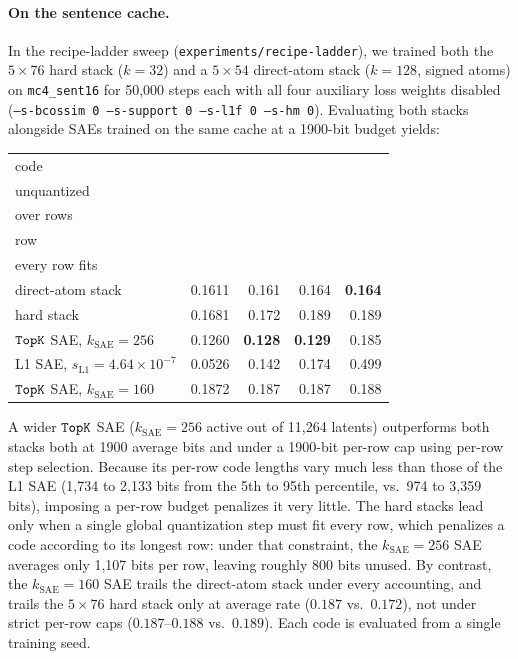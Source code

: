 \paragraph{On the sentence cache.}
In the recipe-ladder sweep (\texttt{experiments/\allowbreak recipe-ladder}), we
trained both the $5\times76$ hard stack ($k{=}32$) and a $5\times54$
direct-atom stack ($k{=}128$, signed atoms) on \texttt{mc4\_sent16} for
50{,}000 steps each with all four auxiliary loss weights disabled
(\texttt{--s-bcossim 0 --s-support 0 --s-l1f 0 --s-hm 0}). Evaluating both
stacks alongside SAEs trained on the same cache at a 1900-bit budget
yields:

\begin{center}\small\setlength{\tabcolsep}{4pt}
\begin{tabular}{@{}lrrrr@{}}
\toprule
code & \stackhead[r]{$\fvu$\\unquantized} & \stackhead[r]{averaged\\over rows} & \stackhead[r]{on every\\row} & \stackhead[r]{one step\\every row fits} \\
\midrule
direct-atom stack & 0.1611 & 0.161 & 0.164 & \textbf{0.164} \\
hard stack & 0.1681 & 0.172 & 0.189 & 0.189 \\
$\mathop{\mathtt{TopK}}\limits$ SAE, $k_{\mathrm{SAE}}{=}256$ & 0.1260 & \textbf{0.128} & \textbf{0.129} & 0.185 \\
L1 SAE, $s_{\mathrm{L1}}{=}4.64\times10^{-7}$ & 0.0526 & 0.142 & 0.174 & 0.499 \\
$\mathop{\mathtt{TopK}}\limits$ SAE, $k_{\mathrm{SAE}}{=}160$ & 0.1872 & 0.187 & 0.187 & 0.188 \\
\bottomrule
\end{tabular}
\end{center}

\noindent A wider $\mathop{\mathtt{TopK}}\limits$ SAE ($k_{\mathrm{SAE}}{=}256$ active out of
11{,}264 latents) outperforms both stacks both at 1900 average bits and
under a 1900-bit per-row cap using per-row step selection. Because its
per-row code lengths vary much less than those of the L1 SAE (1{,}734 to
2{,}133 bits from the 5th to 95th percentile, vs.\ 974 to 3{,}359 bits),
imposing a per-row budget penalizes it very little. The hard stacks lead
only when a single global quantization step must fit every row, which
penalizes a code according to its longest row: under that constraint, the
$k_{\mathrm{SAE}}{=}256$ SAE averages only 1{,}107 bits per row, leaving
roughly 800 bits unused. By contrast, the $k_{\mathrm{SAE}}{=}160$ SAE
trails the direct-atom stack under every accounting, and trails the
$5\times76$ hard stack only at average rate ($0.187$ vs.\ $0.172$), not
under strict per-row caps ($0.187$--$0.188$ vs.\
$0.189$). Each code is evaluated from a single training seed.

